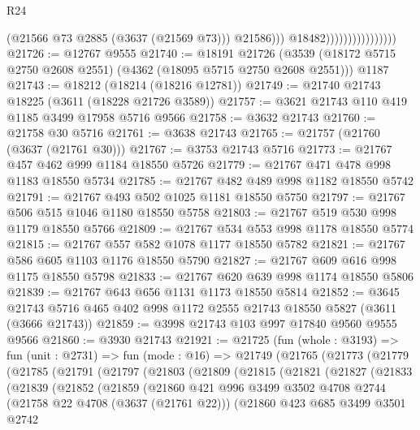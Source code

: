 \begin{lexlean}{R24}
\begin{coremodule}
                                          (@21566 @73 @2885 (@3637 (@21569 @73)))
                                          @21586)))
                                    @18482))))))))))))))))
@21726 := @12767 @9555
@21740 := @18191
    @21726
    (@3539 (@18172 @5715 @2750 @2608 @2551) (@4362 (@18095 @5715 @2750 @2608 @2551)))
    @1187
@21743 := @18212 (@18214 (@18216 @12781))
@21749 := @21740 @21743 @18225 (@3611 (@18228 @21726 @3589))
@21757 := @3621 @21743 @110 @419 @1185 @3499 @17958 @5716 @9566
@21758 := @3632 @21743
@21760 := @21758 @30 @5716
@21761 := @3638 @21743
@21765 := @21757 (@21760 (@3637 (@21761 @30)))
@21767 := @3753 @21743 @5716
@21773 := @21767 @457 @462 @999 @1184 @18550 @5726
@21779 := @21767 @471 @478 @998 @1183 @18550 @5734
@21785 := @21767 @482 @489 @998 @1182 @18550 @5742
@21791 := @21767 @493 @502 @1025 @1181 @18550 @5750
@21797 := @21767 @506 @515 @1046 @1180 @18550 @5758
@21803 := @21767 @519 @530 @998 @1179 @18550 @5766
@21809 := @21767 @534 @553 @998 @1178 @18550 @5774
@21815 := @21767 @557 @582 @1078 @1177 @18550 @5782
@21821 := @21767 @586 @605 @1103 @1176 @18550 @5790
@21827 := @21767 @609 @616 @998 @1175 @18550 @5798
@21833 := @21767 @620 @639 @998 @1174 @18550 @5806
@21839 := @21767 @643 @656 @1131 @1173 @18550 @5814
@21852 := @3645 @21743 @5716 @465 @402 @998 @1172 @2555 @21743 @18550 @5827 (@3611 (@3666 @21743))
@21859 := @3998 @21743 @103 @997 @17840 @9560 @9555 @9566
@21860 := @3930 @21743
@21921 := @21725
    (fun (whole : @3193) =>
    fun (unit : @2731) =>
    fun (mode : @16) =>
    @21749
      (@21765
        (@21773
          (@21779
            (@21785
              (@21791
                (@21797
                  (@21803
                    (@21809
                      (@21815
                        (@21821
                          (@21827
                            (@21833
                              (@21839
                                (@21852
                                  (@21859
                                    (@21860
                                      @421
                                      @996
                                      @3499
                                      @3502
                                      @4708
                                      @2744
                                      (@21758 @22 @4708 (@3637 (@21761 @22)))
                                      (@21860
                                        @423
                                        @685
                                        @3499
                                        @3501
                                        @2742

\end{coremodule}
\end{lexlean}
